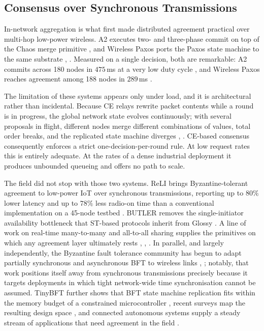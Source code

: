 \documentclass[journal]{IEEEtran}
\newcommand{\CE}{CE}                      %
\newcommand{\ReLI}{ReLI}                  %
\begin{document}
\subsection{Consensus over Synchronous Transmissions}
\label{sec:back-consensus}

In-network aggregation is what first made distributed agreement practical
over multi-hop low-power wireless. A2 executes two- and three-phase commit
on top of the Chaos merge primitive \cite{alnahas17a2}, and Wireless Paxos
ports the Paxos state machine to the same substrate
\cite{poirot19paxos}, \cite{poirot20thesis}. Measured on a single
decision, both are remarkable: A2 commits across 180 nodes in
$475$\,ms at a very low duty cycle \cite{alnahas17a2}, and Wireless Paxos
reaches agreement among 188 nodes in $289$\,ms \cite{poirot19paxos}.

The limitation of these systems appears only under load, and it is
architectural rather than incidental. Because \CE{} relays rewrite packet
contents while a round is in progress, the global network state evolves
continuously; with several proposals in flight, different nodes merge
different combinations of values, total order breaks, and the replicated
state machine diverges \cite{alnahas17a2}, \cite{poirot20thesis}.
\CE-based consensus consequently enforces a strict one-decision-per-round
rule. At low request rates this is entirely adequate. At the rates of a
dense industrial deployment it produces unbounded queueing and offers no
path to scale.

The field did not stop with those two systems. {\ReLI} brings
Byzantine-tolerant agreement to low-power IoT over synchronous
transmissions, reporting up to $80\%$ lower latency and up to $78\%$ less
radio-on time than a conventional implementation on a 45-node testbed
\cite{goyal22reli}. BUTLER removes the single-initiator availability
bottleneck that ST-based protocols inherit from Glossy
\cite{mager22butler}. A line of work on real-time many-to-many and
all-to-all sharing supplies the primitives on which any agreement layer
ultimately rests \cite{debadarshini23timecast},
\cite{debadarshini23synccast}, \cite{debadarshini24structure}. In
parallel, and largely independently, the Byzantine fault tolerance
community has begun to adapt partially synchronous and asynchronous BFT to
wireless links \cite{liu25partiallysync}, \cite{liu25asyncbft}; notably,
that work positions itself away from synchronous transmissions precisely
because it targets deployments in which tight network-wide time
synchronisation cannot be assumed. TinyBFT further shows that BFT state
machine replication fits within the memory budget of a constrained
microcontroller \cite{boehm24tinybft}, recent surveys map the resulting
design space \cite{zou24survey}, and connected autonomous systems supply a
steady stream of applications that need agreement in the field
\cite{wu25dag}.
\end{document}
